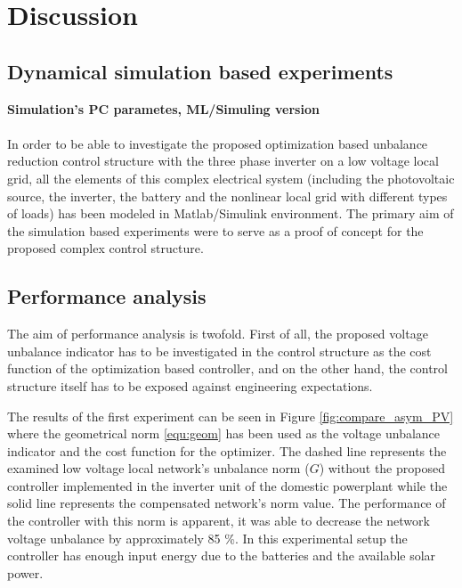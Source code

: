 \section{Discussion}\label{VUB:sec:Discussion}


    \subsection{Dynamical simulation based experiments}\label{VUB:sec:Results}
		
		\textbf{Simulation's PC parametes, ML/Simuling version}\\
\\
    In order to be able to investigate the proposed optimization based unbalance reduction control structure with the three phase inverter on a low voltage local grid, all the elements of this complex electrical system (including the photovoltaic source, the inverter, the battery and the nonlinear local grid with different types of loads) has been modeled in Matlab/Simulink environment. The primary aim of the simulation based experiments were to serve as a proof of concept for the proposed complex control structure.

    \subsection{Performance analysis}\label{VUB:sec:Performance}

    The aim of performance analysis is twofold. First of all, the proposed voltage unbalance indicator has to be investigated in the control structure as the cost function of the optimization based controller, and on the other hand, the control structure itself has to be exposed against engineering expectations.


            The results of the first experiment can be seen in Figure \ref{fig:compare_asym_PV} where the geometrical norm \ref{equ:geom} has been used as the voltage unbalance indicator and the cost function for the optimizer.  The dashed line represents the examined low voltage local network's unbalance norm ($G$) without the proposed controller implemented in the inverter unit of the domestic powerplant while the solid line represents the compensated network's norm value. The performance of the controller with this norm is apparent, it was able to decrease the network voltage unbalance by approximately 85 \%. In this experimental setup the controller has enough input energy due to the batteries and the available solar power.

